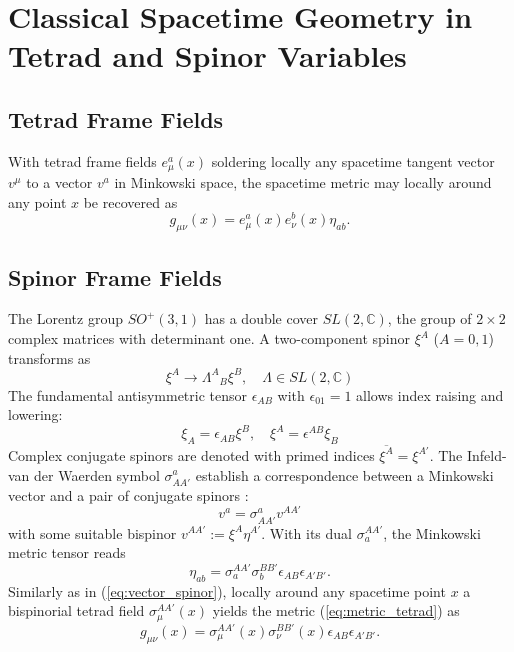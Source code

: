 \documentclass[11pt,a4paper]{article}
\theoremstyle{definition}
\begin{document}
	\section{Classical Spacetime Geometry in Tetrad and Spinor Variables}
	
	\subsection{Tetrad Frame Fields}
	With tetrad frame fields $e^a_\mu(x)$ soldering locally any spacetime tangent vector $v^\mu$ to a vector $v^a$ in Minkowski space,
	the spacetime metric may locally around any point $x$ be recovered as
	\begin{equation}
		g_{\mu\nu}(x) = e^a_\mu(x) e^b_\nu(x) \eta_{ab} .
		\label{eq:metric_tetrad}
	\end{equation}
	
	\subsection{Spinor Frame Fields}
	The Lorentz group $SO^+(3,1)$ has a double cover $SL(2,\mathbb{C})$, the group of $2\times 2$ complex matrices with determinant one. A two-component spinor $\xi^A$ ($A = 0,1$) transforms as
	\begin{equation}
		\xi^A \to \Lambda^A{}_B \xi^B, \quad \Lambda \in SL(2,\mathbb{C})
		\label{eq:spinor_transf}
	\end{equation}
	The fundamental antisymmetric tensor $\epsilon_{AB}$ with $\epsilon_{01} = 1$ allows index raising and lowering:
	\begin{equation}
		\xi_A = \epsilon_{AB}\xi^B, \quad \xi^A = \epsilon^{AB}\xi_B
	\end{equation}	
	Complex conjugate spinors are denoted with primed indices $\overline{\xi^A} = \xi^{A'}$. The Infeld-van der Waerden symbol $\sigma^a_{AA'}$ establish a correspondence between a Minkowski vector and a pair of conjugate spinors \cite{penrose1984}:
	\begin{equation}
		v^a =  \sigma^a_{AA'} v^{AA'} 
		\label{eq:vector_spinor}
	\end{equation}
	with some suitable bispinor $v^{AA'}:=\xi^A\eta^{A'}$. With its dual $\sigma^{AA'}_a$,
	the Minkowski metric tensor reads
	\begin{equation}
		\eta_{ab} = \sigma^{AA'}_a\sigma^{BB'}_b\epsilon_{AB}\epsilon_{A'B'} .
	\end{equation}
	Similarly as in (\ref{eq:vector_spinor}), 
	locally around any spacetime point $x$ a bispinorial tetrad field $\sigma^{AA'}_\mu(x)$ yields 
	the metric (\ref{eq:metric_tetrad}) as 
	\begin{equation}
		g_{\mu\nu}(x) = \sigma^{AA'}_\mu(x) \sigma^{BB'}_\nu(x) \epsilon_{AB}\epsilon_{A'B'} .
		\label{eq:metric_spinorial}
	\end{equation}
	
\end{document}
